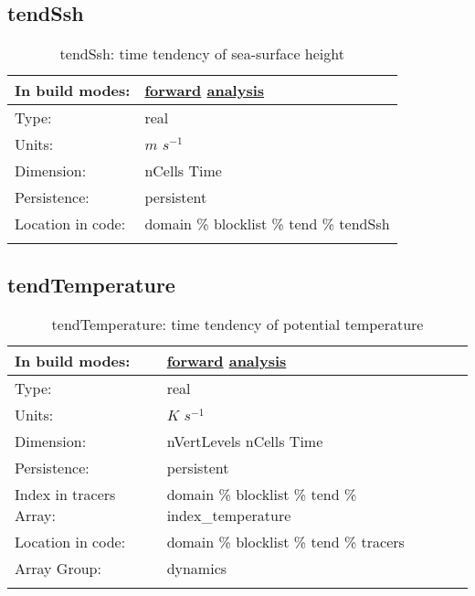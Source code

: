 \subsection[tendSsh]{tendSsh}
\label{subsec:var_sec_tend_tendSsh}
\begin{center}
\begin{longtable}{| p{2.0in} | p{4.0in} |}
        \hline 
        In build modes: & \hyperref[subsec:forward_var_tab_tend]{forward} \hyperref[subsec:analysis_var_tab_tend]{analysis} \\
        \hline 
        Type: & real \\
        \hline 
        Units: & $m$ $s^{-1}$ \\
        \hline 
        Dimension: & nCells Time \\
        \hline 
        Persistence: & persistent \\
        \hline 
		 Location in code: & domain \% blocklist \% tend \% tendSsh \\
		 \hline 
    \caption{tendSsh: time tendency of sea-surface height}
\end{longtable}
\end{center}
\subsection[tendTemperature]{tendTemperature}
\label{subsec:var_sec_tend_tendTemperature}
\begin{center}
\begin{longtable}{| p{2.0in} | p{4.0in} |}
        \hline 
        In build modes: & \hyperref[subsec:forward_var_tab_tend]{forward} \hyperref[subsec:analysis_var_tab_tend]{analysis} \\
        \hline 
        Type: & real \\
        \hline 
        Units: & $K$ $s^{-1}$ \\
        \hline 
        Dimension: & nVertLevels nCells Time \\
        \hline 
        Persistence: & persistent \\
        \hline 
		 Index in tracers Array: & domain \% blocklist \% tend \% index\_temperature \\
		 \hline 
		 Location in code: & domain \% blocklist \% tend \% tracers \\
		 \hline 
		 Array Group: & dynamics \\
		 \hline 
    \caption{tendTemperature: time tendency of potential temperature}
\end{longtable}
\end{center}
